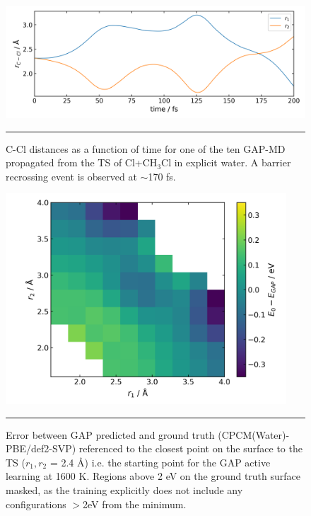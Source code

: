 \documentclass[../../main.tex]{subfiles}
\begin{document}
\begin{figure}[h!]
	\vspace{0.4cm}
	\centering
	\includegraphics[width=11.5cm]{6/gap/figs_si/fig22}
	\vspace{0.2cm}
	\hrule
	\caption{C-Cl distances as a function of time for one of the ten GAP-MD propagated from the TS of Cl+CH${}_3$Cl in explicit water. A barrier recrossing event is observed at $\sim$170 fs.}
	\label{fig::ml_si_22}
\end{figure}



\begin{figure}[h!]
	\vspace{0.4cm}
	\centering
	\includegraphics[width=10.5cm]{6/gap/figs_si/fig23}
	\vspace{0.2cm}
	\hrule
	\caption{Error between GAP predicted and ground truth (CPCM(Water)-PBE/def2-SVP) referenced to the closest point on the surface to the TS ($r_1, r_2 $ = 2.4 \AA) i.e. the starting point for the GAP active learning at 1600 K. Regions above 2 eV on the ground truth surface masked, as the training explicitly does not include any configurations $>$2eV from the minimum. }
	\label{fig::ml_si_23}
\end{figure}
\end{document}
